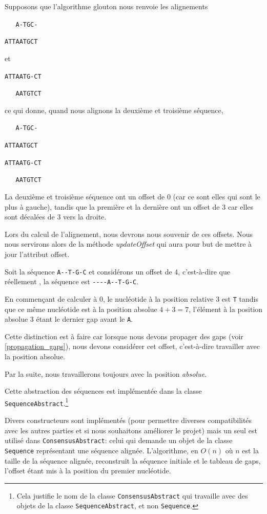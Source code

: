 \begin{exemple} [Offset]
	Supposons que l'algorithme glouton nous renvoie les alignements

	\verb|   A-TGC-|

	\verb|ATTAATGCT|

	et

	\verb|ATTAATG-CT|

	\verb|   AATGTCT|

	ce qui donne, quand nous alignons la deuxième et troisième séquence,

	\verb|   A-TGC-|

	\verb|ATTAATGCT|

	\verb|ATTAATG-CT|

	\verb|   AATGTCT|

	La deuxième et troisième séquence ont un offset de 0 (car ce sont elles qui
	sont le plus à gauche), tandis que la première et la dernière ont un offset
	de 3 car elles sont décalées de 3 vers la droite.

	Lors du calcul de l'alignement, nous devrons nous souvenir de ces offsets.
	Nous nous servirons alors de la méthode \emph{updateOffset} qui aura pour
	but de mettre à jour l'attribut offset.
\end{exemple}

\begin{exemple} 
	Soit la séquence \verb|A--T-G-C| et considérons un offset de 4, c'est-à-dire
	que \og réellement \fg, la séquence est \verb|----A--T-G-C|.

	En commençant de calculer à 0, le nucléotide à la position relative 3 est
	\verb|T| tandis que ce même nucléotide est à la position absolue $4 + 3 = 7$,
	l'élément à la position absolue 3 étant le dernier gap avant le \verb|A|.
\end{exemple}

Cette distinction est à faire car lorsque nous devons propager des gaps (voir
\ref{propagation_gaps}), nous devons considérer cet offset, c'est-à-dire
travailler avec la position absolue.

Par la suite, nous travaillerons toujours avec la position \textit{absolue}.

Cette abstraction des séquences est implémentée dans la classe
\verb|SequenceAbstract|.\footnote{Cela justifie le nom de la classe
	\verb|ConsensusAbstract| qui travaille avec des objets de la classe
\verb|SequenceAbstract|, et non \verb|Sequence|.}

Divers constructeurs sont implémentés (pour permettre diverses compatibilités
avec les autres parties et si nous souhaitons améliorer le projet) mais un seul
est utilisé dans \verb|ConsensusAbstract|: celui qui demande un objet de la
classe \verb|Sequence| représentant une séquence alignée.  L'algorithme, en
$O(n)$ où $n$ est la taille de la séquence alignée, reconstruit la séquence
initiale et le tableau de gaps, l'offset étant mis à la position du premier
nucléotide.

